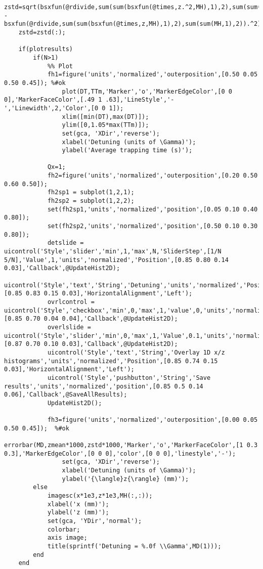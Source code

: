 \begin{lstlisting}[style=MatlabStyle]
    zstd=sqrt(bsxfun(@rdivide,sum(sum(bsxfun(@times,z.^2,MH),1),2),sum(sum(MH,1),2)) - bsxfun(@rdivide,sum(sum(bsxfun(@times,z,MH),1),2),sum(sum(MH,1),2)).^2);
    zstd=zstd(:);
    
    if(plotresults)
        if(N>1)
            %% Plot
            fh1=figure('units','normalized','outerposition',[0.50 0.05 0.50 0.45]); %#ok
                plot(DT,TTm,'Marker','o','MarkerEdgeColor',[0 0 0],'MarkerFaceColor',[.49 1 .63],'LineStyle','-','Linewidth',2,'Color',[0 0 1]);
                xlim([min(DT),max(DT)]);
                ylim([0,1.05*max(TTm)]);
                set(gca, 'XDir','reverse');
                xlabel('Detuning (units of \Gamma)');
                ylabel('Average trapping time (s)');

            Qx=1;
            fh2=figure('units','normalized','outerposition',[0.20 0.50 0.60 0.50]);  
            fh2sp1 = subplot(1,2,1);
            fh2sp2 = subplot(1,2,2);
            set(fh2sp1,'units','normalized','position',[0.05 0.10 0.40 0.80]);
            set(fh2sp2,'units','normalized','position',[0.50 0.10 0.30 0.80]);
            detslide = uicontrol('Style','slider','min',1,'max',N,'SliderStep',[1/N 5/N],'Value',1,'units','normalized','Position',[0.85 0.80 0.14 0.03],'Callback',@UpdateHist2D);
            uicontrol('Style','text','String','Detuning','units','normalized','Position',[0.85 0.83 0.15 0.03],'HorizontalAlignment','Left');
            ovrlcontrol = uicontrol('Style','checkbox','min',0,'max',1,'value',0,'units','normalized','Position',[0.85 0.70 0.04 0.04],'Callback',@UpdateHist2D);
            overlslide = uicontrol('Style','slider','min',0,'max',1,'Value',0.1,'units','normalized','Position',[0.87 0.70 0.10 0.03],'Callback',@UpdateHist2D);
            uicontrol('Style','text','String','Overlay 1D x/z histograms','units','normalized','Position',[0.85 0.74 0.15 0.03],'HorizontalAlignment','Left');
            uicontrol('Style','pushbutton','String','Save results','units','normalized','position',[0.85 0.5 0.14 0.06],'Callback',@SaveAllResults);
            UpdateHist2D();

            fh3=figure('units','normalized','outerposition',[0.00 0.05 0.50 0.45]);  %#ok
                errorbar(MD,zmean*1000,zstd*1000,'Marker','o','MarkerFaceColor',[1 0.3 0.3],'MarkerEdgeColor',[0 0 0],'color',[0 0 0],'linestyle','-');
                set(gca, 'XDir','reverse');
                xlabel('Detuning (units of \Gamma)');
                ylabel('{\langle}z{\rangle} (mm)');
        else
            imagesc(x*1e3,z*1e3,MH(:,:));
            xlabel('x (mm)');
            ylabel('z (mm)');
            set(gca, 'YDir','normal');
            colorbar;
            axis image;
            title(sprintf('Detuning = %.0f \\Gamma',MD(1)));
        end
    end
    


\end{lstlisting}
